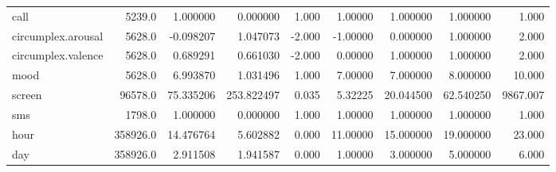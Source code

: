 \begin{tabular}{lrrrrrrrr}
call                 &    5239.0 &    1.000000 &    0.000000 &      1.000 &   1.00000 &   1.000000 &    1.000000 &      1.000 \\
circumplex.arousal   &    5628.0 &   -0.098207 &    1.047073 &     -2.000 &  -1.00000 &   0.000000 &    1.000000 &      2.000 \\
circumplex.valence   &    5628.0 &    0.689291 &    0.661030 &     -2.000 &   0.00000 &   1.000000 &    1.000000 &      2.000 \\
mood                 &    5628.0 &    6.993870 &    1.031496 &      1.000 &   7.00000 &   7.000000 &    8.000000 &     10.000 \\
screen               &   96578.0 &   75.335206 &  253.822497 &      0.035 &   5.32225 &  20.044500 &   62.540250 &   9867.007 \\
sms                  &    1798.0 &    1.000000 &    0.000000 &      1.000 &   1.00000 &   1.000000 &    1.000000 &      1.000 \\
hour                 &  358926.0 &   14.476764 &    5.602882 &      0.000 &  11.00000 &  15.000000 &   19.000000 &     23.000 \\
day                  &  358926.0 &    2.911508 &    1.941587 &      0.000 &   1.00000 &   3.000000 &    5.000000 &      6.000 \\
\bottomrule
\end{tabular}
